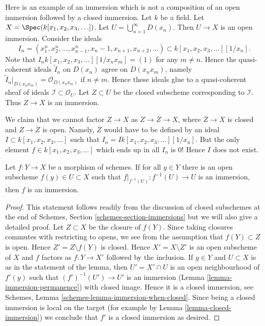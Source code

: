 \begin{example}
\label{example-thibaut}
Here is an example of an immersion which is not a composition of an
open immersion followed by a closed immersion.
Let $k$ be a field.
Let $X = \Spec(k[x_1, x_2, x_3, \ldots])$.
Let $U = \bigcup_{n = 1}^{\infty} D(x_n)$.
Then $U \to X$ is an open immersion.
Consider the ideals
$$
I_n =
(x_1^n, x_2^n, \ldots, x_{n - 1}^n, x_n - 1, x_{n + 1}, x_{n + 2}, \ldots)
\subset
k[x_1, x_2, x_3, \ldots][1/x_n].
$$
Note that $I_n k[x_1, x_2, x_3, \ldots][1/x_nx_m] = (1)$
for any $m \not = n$. Hence the quasi-coherent ideals
$\widetilde I_n$ on $D(x_n)$ agree on $D(x_nx_m)$, namely
$\widetilde I_n|_{D(x_nx_m)} = \mathcal{O}_{D(x_n x_m)}$ if
$n \not = m$. Hence these ideals glue to a quasi-coherent sheaf of ideals
$\mathcal{I} \subset \mathcal{O}_U$.
Let $Z \subset U$ be the closed subscheme corresponding to
$\mathcal{I}$. Thus $Z \to X$ is an immersion.

\medskip\noindent
We claim that we cannot factor $Z \to X$ as
$Z \to \overline{Z} \to X$, where $\overline{Z} \to X$ is closed
and $Z \to \overline{Z}$ is open. Namely, $\overline{Z}$ would
have to be defined by an ideal $I \subset k[x_1, x_2, x_3, \ldots]$
such that $I_n = I k[x_1, x_2, x_3, \ldots][1/x_n]$.
But the only element $f \in k[x_1, x_2, x_3, \ldots]$
which ends up in all $I_n$ is $0$! Hence $I$ does not exist.
\end{example}

\begin{lemma}
\label{lemma-check-immersion}
Let $f : Y \to X$ be a morphism of schemes. If for all $y \in Y$
there is an open subscheme $f(y) \in U \subset X$ such that
$f|_{f^{-1}(U)} : f^{-1}(U) \to U$ is an immersion, then $f$ is
an immersion.
\end{lemma}

\begin{proof}
This statement follows readily from the discussion of closed subschemes
at the end of Schemes, Section \ref{schemes-section-immersions}
but we will also give a detailed proof.
Let $Z \subset X$ be the closure of $f(Y)$. Since taking closures
commutes with restricting to opens, we see from the assumption that
$f(Y) \subset Z$ is open. Hence $Z' = Z \setminus f(Y)$ is closed.
Hence $X' = X \setminus Z'$ is an open subscheme of $X$ and
$f$ factors as $f : Y \to X'$ followed by the inclusion.
If $y \in Y$ and $U \subset X$ is as in the statement
of the lemma, then $U' = X' \cap U$ is an open neighbourhood
of $f'(y)$ such that $(f')^{-1}(U') \to U'$ is an immersion
(Lemma \ref{lemma-immersion-permanence}) with closed image.
Hence it is a closed immersion, see
Schemes, Lemma \ref{schemes-lemma-immersion-when-closed}.
Since being a closed immersion is local on the target
(for example by Lemma \ref{lemma-closed-immersion})
we conclude that $f'$ is a closed immersion as desired.
\end{proof}








